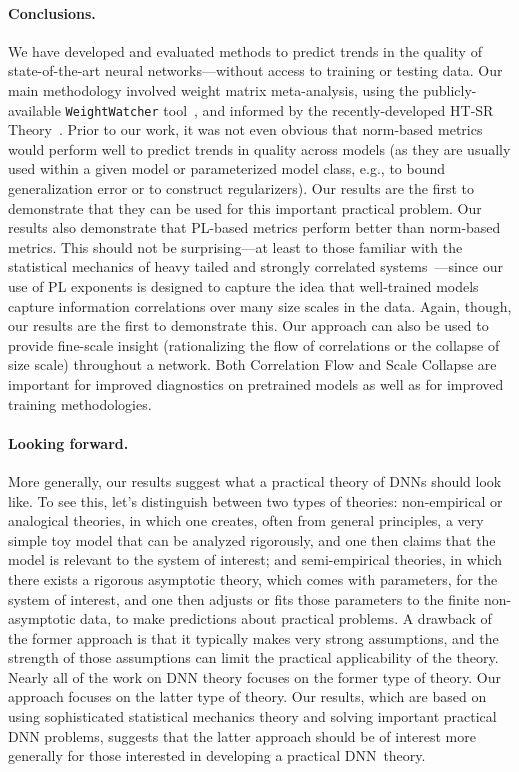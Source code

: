 \paragraph{Conclusions.}

We have developed and evaluated methods to predict trends in the quality of state-of-the-art neural networks---without access to training or testing data.
Our main methodology involved weight matrix meta-analysis, using the publicly-available \texttt{WeightWatcher} tool~\cite{weightwatcher_package}, and informed by the recently-developed HT-SR Theory~\cite{MM18_TR, MM19_HTSR_ICML, MM20_SDM}.
Prior to our work, it was not even obvious that norm-based metrics would perform well to predict trends in quality across models (as they are usually used within a given model or parameterized model class, e.g., to bound generalization error or to construct regularizers).
Our results are the first to demonstrate that they can be used for this important practical problem.
Our results also demonstrate that PL-based metrics perform better than norm-based metrics. 
This should not be surprising---at least to those familiar with the statistical mechanics of heavy tailed and strongly correlated systems~\cite{BouchaudPotters03, SornetteBook, BP11, bun2017}---since our use of PL exponents is designed to capture the idea that well-trained models capture information correlations over many size scales in the data.
Again, though, our results are the first to demonstrate this.
Our approach can also be used to provide fine-scale insight (rationalizing the flow of correlations or the collapse of size scale) throughout a network. 
Both Correlation Flow and Scale Collapse are important for improved diagnostics on pretrained models as well as for improved training methodologies.


\paragraph{Looking forward.}

More generally, our results suggest what a practical theory of DNNs should look like.
To see this, let's distinguish between two types of theories:
non-empirical or analogical theories, in which one creates, often from general principles, a very simple toy model that can be analyzed rigorously, and one then claims that the model is relevant to the system of interest; and 
semi-empirical theories, in which there exists a rigorous asymptotic theory, which comes with parameters, for the system of interest, and one then adjusts or fits those parameters to the finite non-asymptotic data, to make predictions about practical problems.
A drawback of the former approach is that it typically makes very strong assumptions, and the strength of those assumptions can limit the practical applicability of the theory.
Nearly all of the work on DNN theory focuses on the former type of theory.
Our approach focuses on the latter type of theory.
Our results, which are based on using sophisticated statistical mechanics theory and solving important practical DNN problems, suggests that the latter approach should be of interest more generally for those interested in developing a practical DNN~theory.


